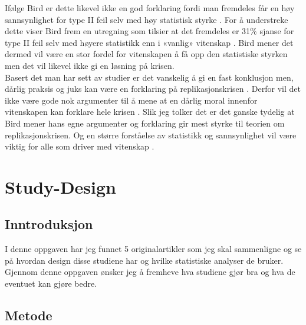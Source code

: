 \documentclass[
]{book}
\begin{document}
Ifølge Bird er dette likevel ikke en god forklaring fordi man fremdeles får en høy sannsynlighet for type II feil selv med høy statistisk styrke \citet{bird2020}.
For å understreke dette viser Bird frem en utregning som tilsier at det fremdeles er 31\% sjanse for type II feil selv med høyere statistikk enn i «vanlig» vitenskap \citet{bird2020}.
Bird mener det dermed vil være en stor fordel for vitenskapen å få opp den statistiske styrken men det vil likevel ikke gi en løsning på krisen.\\
Basert det man har sett av studier er det vanskelig å gi en fast konklusjon men, dårlig praksis og juks kan være en forklaring på replikasjonskrisen \citet{bird2020}.
Derfor vil det ikke være gode nok argumenter til å mene at en dårlig moral innenfor vitenskapen kan forklare hele krisen \citet{bird2020}.
Slik jeg tolker det er det ganske tydelig at Bird mener hans egne argumenter og forklaring gir mest styrke til teorien om replikasjonskrisen.
Og en større forståelse av statistikk og sannsynlighet vil være viktig for alle som driver med vitenskap \citet{bird2020}.

\hypertarget{study-design}{%
\chapter{Study-Design}\label{study-design}}

\hypertarget{inntroduksjon}{%
\section{Inntroduksjon}\label{inntroduksjon}}

I denne oppgaven har jeg funnet 5 originalartikler \citep{billat2000, billat2001, dupont2002, thevenet2007, wakefield2009} som jeg skal sammenligne og se på hvordan design disse studiene har og hvilke statistiske analyser de bruker. Gjennom denne oppgaven ønsker jeg å fremheve hva studiene gjør bra og hva de eventuet kan gjøre bedre.

\hypertarget{metode-1}{%
\section{Metode}\label{metode-1}}
\end{document}

